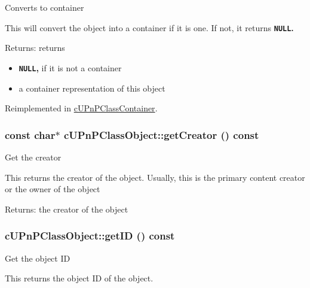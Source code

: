 Converts to container

This will convert the object into a container if it is one. If not, it returns {\bf {\tt NULL}.} 

\begin{Desc}
\item[Returns:]returns\begin{itemize}
\item {\bf {\tt NULL},} if it is not a container\item a container representation of this object \end{itemize}
\end{Desc}


Reimplemented in \hyperlink{classcUPnPClassContainer_32eb7f1d0b3821f0d9573fe59befdf10}{cUPnPClassContainer}.\hypertarget{classcUPnPClassObject_2069a6b6653c5dcbbaa582fbc9ea3075}{
\subsubsection[{getCreator}]{\setlength{\rightskip}{0pt plus 5cm}const char$\ast$ cUPnPClassObject::getCreator () const}}
\label{classcUPnPClassObject_2069a6b6653c5dcbbaa582fbc9ea3075}


Get the creator

This returns the creator of the object. Usually, this is the primary content creator or the owner of the object

\begin{Desc}
\item[Returns:]the creator of the object \end{Desc}
\hypertarget{classcUPnPClassObject_8ae04f4f645c764c0179be1cbf99941a}{
\subsubsection[{getID}]{ cUPnPClassObject::getID () const}}
\label{classcUPnPClassObject_8ae04f4f645c764c0179be1cbf99941a}


Get the object ID

This returns the object ID of the object.

